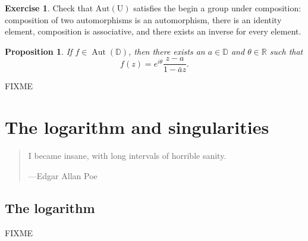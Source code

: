 \documentclass[12pt,openany]{book}
\newcommand{\R}{{\mathbb{R}}}
\newcommand{\D}{{\mathbb{D}}}
\theoremstyle{plain}
\newtheorem{thm}{Theorem}[section]
\newtheorem{prop}[thm]{Proposition}
\theoremstyle{remark}
\theoremstyle{definition}
\newenvironment{exbox}{%
    \def\FrameCommand{\vrule width 1pt \relax\hspace {10pt}}%
    \MakeFramed {\advance \hsize -\width \FrameRestore }%
}{%
    \endMakeFramed
}
\newenvironment{myquote}{%
    \begin{quote}%
    \begingroup\itshape
}{%
    \endgroup%
    \end{quote}
}
\theoremstyle{exercise}
\newtheorem{exercise}{Exercise}[section]
\theoremstyle{example}
\begin{document}
\begin{exbox}
\begin{exercise}
Check that
$\operatorname{Aut(U)}$ satisfies the begin a group under composition:
composition of two automorphisms is an automorphism,
there is an identity element,
composition is associative,
and there exists an inverse for every element.
\end{exercise}
\end{exbox}

\begin{prop}
If $f \in \operatorname{Aut}(\D)$, then there exists an $a \in \D$
and $\theta \in \R$ such that
\begin{equation*}
f(z) = e^{i\theta} \frac{z-a}{1-\bar{a}z} .
\end{equation*}
\end{prop}

FIXME


\chapter{The logarithm and singularities} \label{ch:FIXME}

\begin{myquote}
I became insane, with long intervals of horrible sanity.

---Edgar Allan Poe
\end{myquote}


\section{The logarithm}
\label{sec:log}

FIXME





%
%
%
%
%
%
%
%
\end{document}
